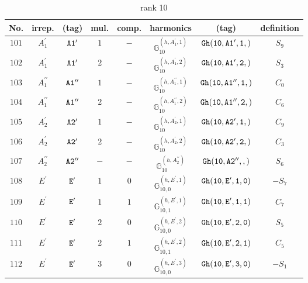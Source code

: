 \documentclass[fleqn,8pt]{jsarticle}
\begin{document}
\begin{table}[ht!]
\begin{center}
\caption{rank 10}
\renewcommand{\arraystretch}{1.3}
\begin{tabular}{cccccccc} \hline \hline
No. & irrep. & (tag) & mul. & comp. & harmonics & (tag) & definition \\ \hline
$ 101 $ & $ A_{1}^{\prime} $ & $ {\tt A1'} $ & $ 1 $ & $ - $ & $ \mathbb{G}_{10}^{(h,A_{1}^{\prime},1)} $ & $ {\tt Gh(10,A1',1,)} $ & $ S_{9} $ \\
$ 102 $ & $ A_{1}^{\prime} $ & $ {\tt A1'} $ & $ 2 $ & $ - $ & $ \mathbb{G}_{10}^{(h,A_{1}^{\prime},2)} $ & $ {\tt Gh(10,A1',2,)} $ & $ S_{3} $ \\
$ 103 $ & $ A_{1}^{\prime\prime} $ & $ {\tt A1''} $ & $ 1 $ & $ - $ & $ \mathbb{G}_{10}^{(h,A_{1}^{\prime\prime},1)} $ & $ {\tt Gh(10,A1'',1,)} $ & $ C_{0} $ \\
$ 104 $ & $ A_{1}^{\prime\prime} $ & $ {\tt A1''} $ & $ 2 $ & $ - $ & $ \mathbb{G}_{10}^{(h,A_{1}^{\prime\prime},2)} $ & $ {\tt Gh(10,A1'',2,)} $ & $ C_{6} $ \\
$ 105 $ & $ A_{2}^{\prime} $ & $ {\tt A2'} $ & $ 1 $ & $ - $ & $ \mathbb{G}_{10}^{(h,A_{2}^{\prime},1)} $ & $ {\tt Gh(10,A2',1,)} $ & $ C_{9} $ \\
$ 106 $ & $ A_{2}^{\prime} $ & $ {\tt A2'} $ & $ 2 $ & $ - $ & $ \mathbb{G}_{10}^{(h,A_{2}^{\prime},2)} $ & $ {\tt Gh(10,A2',2,)} $ & $ C_{3} $ \\
$ 107 $ & $ A_{2}^{\prime\prime} $ & $ {\tt A2''} $ & $ - $ & $ - $ & $ \mathbb{G}_{10}^{(h,A_{2}^{\prime\prime})} $ & $ {\tt Gh(10,A2'',,)} $ & $ S_{6} $ \\
$ 108 $ & $ E^{\prime} $ & $ {\tt E'} $ & $ 1 $ & $ 0 $ & $ \mathbb{G}_{10,0}^{(h,E^{\prime},1)} $ & $ {\tt Gh(10,E',1,0)} $ & $ - S_{7} $ \\
$ 109 $ & $ E^{\prime} $ & $ {\tt E'} $ & $ 1 $ & $ 1 $ & $ \mathbb{G}_{10,1}^{(h,E^{\prime},1)} $ & $ {\tt Gh(10,E',1,1)} $ & $ C_{7} $ \\
$ 110 $ & $ E^{\prime} $ & $ {\tt E'} $ & $ 2 $ & $ 0 $ & $ \mathbb{G}_{10,0}^{(h,E^{\prime},2)} $ & $ {\tt Gh(10,E',2,0)} $ & $ S_{5} $ \\
$ 111 $ & $ E^{\prime} $ & $ {\tt E'} $ & $ 2 $ & $ 1 $ & $ \mathbb{G}_{10,1}^{(h,E^{\prime},2)} $ & $ {\tt Gh(10,E',2,1)} $ & $ C_{5} $ \\
$ 112 $ & $ E^{\prime} $ & $ {\tt E'} $ & $ 3 $ & $ 0 $ & $ \mathbb{G}_{10,0}^{(h,E^{\prime},3)} $ & $ {\tt Gh(10,E',3,0)} $ & $ - S_{1} $ \\

\end{tabular}
\end{center}
\end{table}
\end{document}
